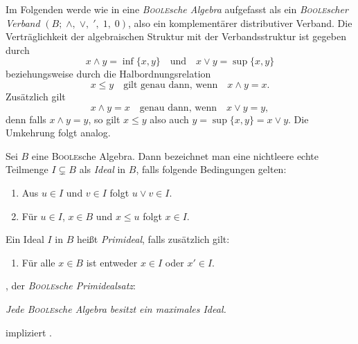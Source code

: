 Im Folgenden werde wie in \cite{graetzer2003general} eine \textit{\textsc{Boole}sche Algebra} aufgefasst als ein \textit{\textsc{Boole}scher Verband} $(B; \;\land, \;\lor, \;', \;1, \;0)$, also ein komplementärer distributiver Verband. 
Die Verträglichkeit der algebraischen Struktur mit der Verbandsstruktur ist gegeben durch 
\begin{displaymath}
  x \land y = \inf\{x,y\} \quad \text{und} \quad x \lor y = \sup\{x,y\}
\end{displaymath}
beziehungsweise durch die Halbordnungsrelation 
\begin{displaymath}
  x \leq y \quad \text{gilt genau dann, wenn} \quad x \land y = x.
\end{displaymath}
Zusätzlich gilt 
\begin{displaymath}
  x \land y = x \quad \text{genau dann, wenn} \quad x \lor y = y,
\end{displaymath}
denn falls $x \land y = y$, so gilt $x \leq y$ also auch $y = \sup\{x,y\} = x \lor y$. 
Die Umkehrung folgt analog.

\begin{defn}
  Sei $B$ eine \textsc{Boole}sche Algebra. Dann bezeichnet man eine nichtleere echte Teilmenge $I \subsetneq B$ als \textit{Ideal} in $B$, falls folgende Bedingungen gelten:
  \begin{enumerate}[(1)]
    \item Aus $u \in I$ und $v \in I$ folgt $u \lor v \in I$.
    \item Für $u \in I$, $x \in B$ und $x \leq u$ folgt  $x \in I$.
  \end{enumerate}
  Ein Ideal $I$ in $B$ heißt \textit{Primideal}, falls zusätzlich gilt:
  \begin{enumerate}[(3)]
    \item Für alle $x \in B$ ist entweder $x \in I$ oder $x' \in I$.
  \end{enumerate}
\end{defn}

\begin{defn}
    \PIT, der \textit{\textsc{Boole}sche Primidealsatz}:
      \begin{addmargin}[2em]{2em}%
        \textit{Jede \textsc{Boole}sche Algebra besitzt ein maximales Ideal.}
      \end{addmargin}
\end{defn}

\begin{thm}
  \label{thm:acpit}
  \AC impliziert \PIT.
\end{thm}

